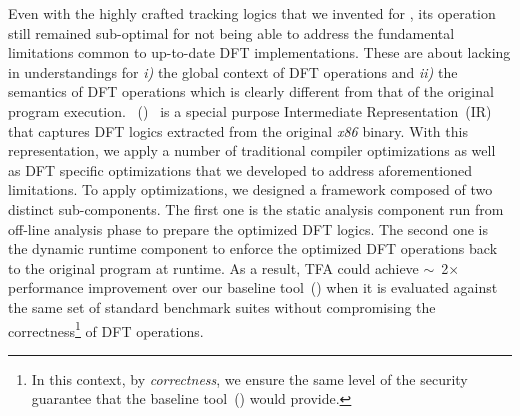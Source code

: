 \documentclass[letterpaper, 10pt]{article}
\begin{document}
\begin{small}

Even with the highly crafted tracking logics that we invented for \libdft, its
operation still remained sub-optimal for not being able to address the
fundamental limitations common to up-to-date DFT implementations. 
%
These are about lacking in understandings for {\it i)} the global context of
DFT operations and {\it ii)} the semantics of DFT operations which is clearly
different from that of the original program execution.
%
\TFAFull~(\TFA)~\cite{tfa:2012ndss} is a special purpose Intermediate
Representation~(IR) that captures DFT logics extracted from the original {\it
x86} binary. With this representation, we apply a number of traditional
compiler optimizations as well as DFT specific optimizations that we developed
to address aforementioned limitations.
%
To apply optimizations, we designed a framework composed of two distinct
sub-components.  The first one is the static analysis component run from
off-line analysis phase to prepare the optimized DFT logics. The second one is
the dynamic runtime component to enforce the optimized DFT operations back to
the original program at runtime.
%
%
As a result, TFA could achieve \(\sim\)~2\(\times\) performance improvement
over  our baseline tool~(\libdft) when it is evaluated against the same set of
standard benchmark suites without compromising the correctness\footnote{In
        this context, by {\it correctness}, we ensure the same level of the
security guarantee that the baseline tool~(\libdft) would provide.} of DFT
operations.


\end{small}
\end{document}
